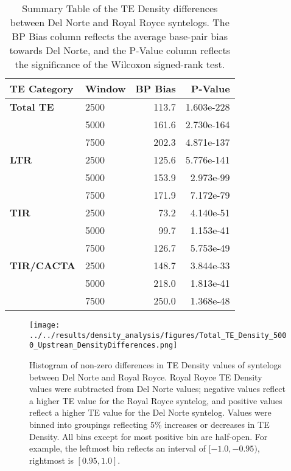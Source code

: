\documentclass[fleqn,10pt]{olplainarticle}
\begin{document}
\begin{table}[ht]
\centering
\begin{tabularx}{\textwidth}{l|X|r|r}
\toprule
\textbf{TE Category} & \textbf{Window} & \textbf{BP Bias} & \textbf{P-Value} \\
\toprule
\textbf{Total TE} & 2500 & 113.7 & 1.603e-228 \\
& 5000 & 161.6 & 2.730e-164 \\
& 7500 & 202.3 & 4.871e-137 \\
\hline
\textbf{LTR} & 2500 & 125.6 & 5.776e-141 \\
& 5000 & 153.9 & 2.973e-99 \\
& 7500 & 171.9 & 7.172e-79 \\
\hline
\textbf{TIR} & 2500 & 73.2 & 4.140e-51 \\
& 5000 & 99.7 & 1.153e-41 \\
& 7500 & 126.7 & 5.753e-49 \\
\textbf{TIR/CACTA} & 2500 & 148.7 & 3.844e-33 \\
& 5000 & 218.0 & 1.813e-41 \\
& 7500 & 250.0 & 1.368e-48 \\
\bottomrule
\end{tabularx}
\caption{Summary Table of the TE Density differences between Del Norte and Royal Royce syntelogs. The BP Bias column reflects the average base-pair bias towards Del Norte, and the P-Value column reflects the significance of the Wilcoxon signed-rank test.}
\label{tab:syntelog_summary}
\end{table}


\begin{figure}[ht]
\centering
\texttt{[image: ../../results/density\_analysis/figures/Total\_TE\_Density\_5000\_Upstream\_DensityDifferences.png]}
\caption{
Histogram of non-zero differences in TE Density values of syntelogs between Del Norte and Royal Royce.
Royal Royce TE Density values were subtracted from Del Norte values; negative values reflect a higher TE value for the Royal Royce syntelog, and positive values reflect a higher TE value for the Del Norte syntelog.
Values were binned into groupings reflecting 5\% increases or decreases in TE Density.
All bins except for most positive bin are half-open.
For example, the leftmost bin reflects an interval of $[-1.0, -0.95)$, rightmost is $[0.95, 1.0]$.
}
\label{fig:syntelog_5000_total}
\end{figure}
\end{document}
